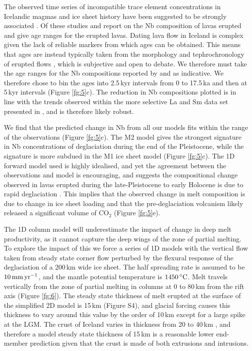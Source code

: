 \documentclass[draft,linenumbers]{agujournal2018}
\begin{document}
The observed time series of incompatible trace element concentrations in Icelandic magmas and ice sheet history have been suggested to be strongly associated \citep{jull-1996,gee-etal-1998,maclennan-etal-2002,sinton-etal-2005,eason-etal-2015}. Of these studies \cite{gee-etal-1998} and \cite{eason-etal-2015} report on the Nb composition of lavas erupted and give age ranges for the erupted lavas. Dating lava flow in Iceland is complex given the lack of reliable markers from which ages can be obtained. This means that ages are instead typically taken from the morphology and tephrochronology of erupted flows \citep{maclennan-etal-2002}, which is subjective and open to debate. We therefore must take the age ranges for the Nb compositions reported by \cite{gee-etal-1998} and \cite{eason-etal-2015} as indicative. We therefore chose to bin the ages into 2.5\,kyr intervals from 0 to 17.5\,ka and then at 5\,kyr intervals (Figure \ref{fg:5}c). The reduction in Nb compositions plotted is in line with the trends observed within the more selective La and Sm data set presented in \cite{maclennan-etal-2002}, and is therefore likely robust.

We find that the predicted change in Nb from all our models fits within the range of the observations (Figure \ref{fg:5}c). The M2 model gives the strongest signature in Nb concentrations of deglaciation during the end of the Pleistocene, while the signature is more subdued in the M1 ice sheet model (Figure \ref{fg:5}c). The 1D forward model used is highly idealised, and yet the agreement between the observations and model is encouraging, and suggests the compositional change observed in lavas erupted during the late-Pleistocene to early Holocene is due to rapid deglaciation \citep{maclennan-etal-2002,sinton-etal-2005,gee-etal-1998,eason-etal-2015}. This implies that the observed change in melt composition is due to change in ice sheet loading and that the pre-deglaciation volcanism likely released a significant volume of CO$_{2}$ (Figure \ref{fg:5}e).

The 1D column model will underestimate the impact of change in deep melt productivity, as it cannot capture the deep wings of the zone of partial melting. To explore the impact of this we force a series of 1D models with the vertical flow taken from steady state corner flow perturbed by the flexural response of the deglaciation of a 200\,km wide ice sheet. The half spreading rate is assumed to be $10\rm\,mm\,yr^{-1}$, and the mantle potential temperature is $1450\rm\,^{\circ}C$. Melt travels vertically from the zone of partial melting in columns at 0 to 80\,km from the rift axis (Figure \ref{fg:6}). The steady state thickness of melt erupted at the surface of the simplified 2D model is 15\,km (Figure S4), and glacial forcing causes this thickness to vary around this value by the order of 10\,km except for a large spike at the LGM. The crust of Iceland varies in thickness from 20 to 40\,km \citep[e.g.][]{jenkins-etal-2018}, and therefore a model steady state thickness of 15\,km is a reasonable lower end-member prediction given that the crust is made of both extrusions and intrusions.
\end{document}
